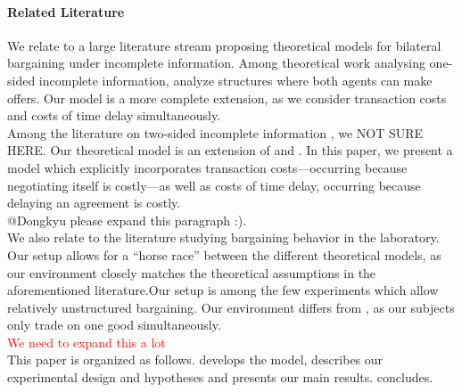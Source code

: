 \paragraph{Related Literature}
We relate to a large literature stream proposing theoretical models for bilateral bargaining under incomplete information. Among theoretical work analysing one-sided incomplete information, \citep{rubinstein1985choice, bikhchandani1992theory, grossman1986perfect, gul1988delay, cramton_dynamic_1991} analyze structures where both agents can make offers. Our model is a more complete extension, as we consider transaction costs and costs of time delay simultaneously. \\
Among the literature on two-sided incomplete information \citep{chatterjee1987bargaining, cramton_strategic_1992, abreu2000bargaining, watson1998alternating}, we NOT SURE HERE. 
Our theoretical model is an extension of \citet{cramton_dynamic_1991} and \citet{cramton_strategic_1992}. In this paper, we present a model which explicitly incorporates transaction costs---occurring because negotiating itself is costly---as well as costs of time delay, occurring because delaying an agreement is costly. \\
@Dongkyu please expand this paragraph :). 
\\
We also relate to the literature studying bargaining behavior in the laboratory. Our setup allows for a ``horse race'' between the different theoretical models, as our environment closely matches the theoretical assumptions in the aforementioned literature.Our setup is among the few experiments which allow relatively unstructured bargaining. Our environment differs from \citet{bochet_beyond_2024}, as our subjects only trade on one good simultaneously. \\
\textcolor{red}{We need to expand this a lot} \\

This paper is organized as follows.  develops the model,  describes our experimental design and hypotheses and  presents our main results.  concludes. 

